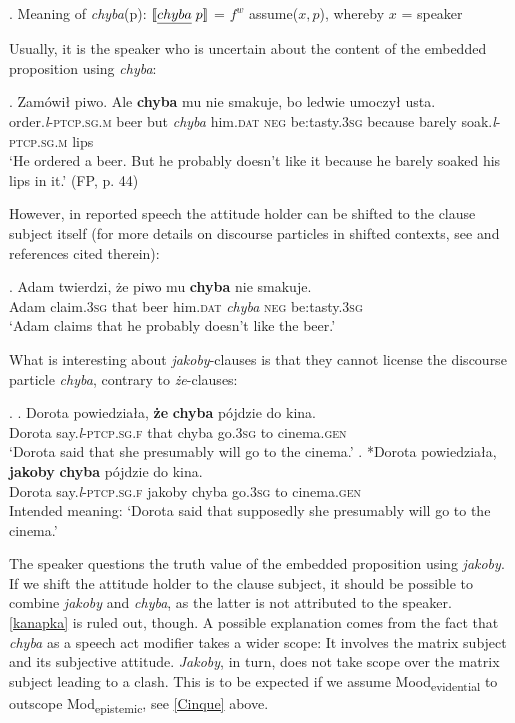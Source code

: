 \documentclass[output=paper
,modfonts
,nonflat]{langsci/langscibook}
\newcommand{\glossformat}[1]{\textsc{#1}}
\newcommand{\thirdperson}{\glossformat{3}\xspace}
\newcommand{\dat}{\glossformat{dat}\xspace}
\newcommand{\fem}{\glossformat{f}\xspace}
\newcommand{\gen}{\glossformat{gen}\xspace}
\newcommand{\negation}{\glossformat{neg}\xspace}
\newcommand{\lptcp}{\emph{l}\glossformat{-ptcp}\xspace}
\newcommand{\masc}{\glossformat{m}\xspace}
\newcommand{\sg}{\glossformat{sg}\xspace}
\newcommand{\nquelle}[1]{\newline\phantom{x}\hfill(#1)}
\begin{document}
\ex.	Meaning of \emph{chyba}(p): \newline
	\([\![\emph{chyba} \; p]\!]\) = $f^{w}$ assume(\( x,p \)), whereby \(x\) = speaker
       
\noindent Usually, it is the speaker who is uncertain about the content of the embedded proposition using \emph{chyba}: 

\exg.		Zamówił piwo. Ale \textbf{chyba} mu nie smakuje, bo ledwie umoczył usta. \\
		order.{\lptcp}.{\sg}.{\masc} beer but \emph{chyba} him.{\dat} {\negation} {be:tasty}.{\thirdperson}{\sg} because barely soak.{\lptcp}.{\sg}.{\masc} lips \\  
		`He ordered a beer. But he probably doesn't like it because he barely soaked his lips in it.' \nquelle{FP, p. 44}

However, in reported speech the attitude holder can be shifted to the clause subject itself (for more details on discourse particles in shifted contexts, see \textcite{Doring2013} and references cited therein):

\exg.		Adam twierdzi, że piwo mu \textbf{chyba} nie smakuje. \\
		Adam claim.{\thirdperson}{\sg} that beer him.{\dat} \emph{chyba} {\negation} {be:tasty}.{\thirdperson}{\sg} \\
		`Adam claims that he probably doesn't like the beer.' 

What is interesting about \emph{jakoby}-clauses is that they cannot license the discourse particle \emph{chyba}, contrary to \emph{że}-clauses: 

\ex.	\ag.	Dorota powiedziała, \textbf{że} \textbf{chyba} pójdzie do kina. \\
		Dorota say.{\lptcp}.{\sg}.{\fem} that chyba go.{\thirdperson}{\sg} to cinema.{\gen} \\
		`Dorota said that she presumably will go to the cinema.' 
	\bg.	*Dorota powiedziała, \textbf{jakoby} \textbf{chyba} pójdzie do kina. \label{kanapka} \\
		Dorota say.{\lptcp}.{\sg}.{\fem} jakoby chyba go.{\thirdperson}{\sg} to cinema.{\gen} \\
		Intended meaning: `Dorota said that supposedly she presumably will go to the cinema.'  

The speaker questions the truth value of the embedded proposition using \emph{jakoby}. If we shift the attitude holder to the clause subject, it should be possible to combine \emph{jakoby} and \emph{chyba}, as the latter is not attributed to the speaker. \ref{kanapka} is ruled out, though. A possible explanation comes from the fact that \emph{chyba} as a speech act modifier takes a wider scope: It involves the matrix subject and its subjective attitude. \emph{Jakoby}, in turn, does not take scope over the matrix subject leading to a clash. This is to be expected if we assume Mood\textsubscript{evidential} to outscope Mod\textsubscript{epistemic}, see \ref{Cinque} above. 
\end{document}
